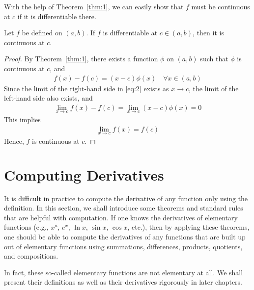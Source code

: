 \documentclass[thmcnt=section, 12pt]{my-elegantbook}
\begin{document}

With the help of Theorem~\ref{thm:1}, we can easily show that $f$ must be continuous at $c$ if it is differentiable there.

\begin{theorem} \label{thm:2}
    Let $f$ be defined on $(a, b)$. If $f$ is differentiable at $c \in (a, b)$, then it is continuous at $c$.
\end{theorem}

\begin{proof}
    By Theorem~\ref{thm:1}, there exists a function $\phi$ on $(a, b)$ such that $\phi$ is continuous at $c$, and
    \begin{align}
        f(x) - f(c) = (x - c) \phi(x)
        \quad \forall x \in (a, b)
        \label{eq:2}
    \end{align}
    Since the limit of the right-hand side in \eqref{eq:2} exists as $x \to c$, the limit of the left-hand side also exists, and 
    \begin{align*}
        \lim_{x \to c} f(x) - f(c)
        = \lim_{x \to c}(x - c) \phi(x)
        = 0
    \end{align*}
    This implies 
    \begin{align*}
        \lim_{x \to c} f(x) = f(c)
    \end{align*}
    Hence, $f$ is continuous at $c$.
\end{proof}


\section{Computing Derivatives}

It is difficult in practice to compute the derivative of any function only using the definition. In this section, we shall introduce some theorems and standard rules that are helpful with computation. If one knows the derivatives of elementary functions (e.g., $x^a$, $e^x$, $\ln x$, $\sin x$, $\cos x$, etc.), then by applying these theorems, one should be able to compute the derivatives of any functions that are built up out of elementary functions using summations, differences, products, quotients, and compositions.

\begin{note}
    In fact, these so-called elementary functions are not elementary at all. We shall present their definitions as well as their derivatives rigorously in later chapters.
\end{note}
\end{document}
